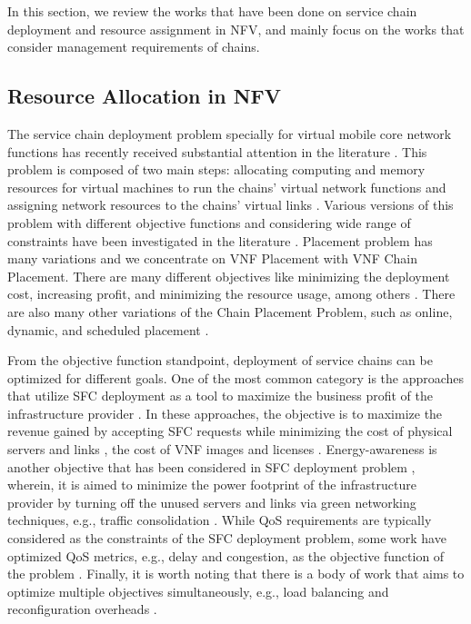 In this section, we review the works that have been done on service chain deployment and resource assignment in NFV, and mainly focus on the works that consider management requirements of chains.

\subsection{Resource Allocation in NFV}
The service chain deployment problem specially for virtual mobile core network functions has recently received substantial attention in the literature \cite{GilHerrera2016,Laghrissi2019,Bhamare2016}.
This problem is composed of two main steps: allocating computing and memory resources for virtual machines to run the chains' virtual network functions and assigning network resources to the chains' virtual links \cite{Laghrissi2019}. 
Various versions of this problem with different objective functions and considering wide range of constraints have been investigated in the literature \cite{Laghrissi2019}.
Placement problem has many variations and we concentrate on VNF Placement with VNF Chain Placement. There are many different objectives
like minimizing the deployment cost, increasing profit, and minimizing the resource usage, among others \cite{Laghrissi2019,Bhamare2016}.
There are also many other variations of the Chain Placement Problem, such as online, dynamic, and scheduled placement \cite{1608.00095}.

From the objective function standpoint, deployment of service chains can be optimized for different goals.
One of the most common category is the approaches that utilize SFC deployment as a tool to maximize the business profit of the infrastructure provider \cite{Eramo2016,Eramo2017,TahmasbiNejad2018,Huang2019}.
In these approaches, the objective is to maximize the revenue gained by accepting SFC requests while minimizing the cost of physical servers and links \cite{Bouet2015,Pham2020,Huang2019}, the cost of VNF images and licenses \cite{Bouet2015}.
Energy-awareness is another objective that has been considered in SFC deployment problem \cite{Eramo2017,Eramo20172,Farkiani2019},
wherein, it is aimed to minimize the power footprint of the infrastructure provider by turning off the unused servers and links via green networking techniques, e.g., traffic consolidation \cite{Zheng2020}.
While QoS requirements are typically considered as the constraints of the SFC deployment problem, some work have optimized QoS metrics, e.g., delay and congestion, as the objective function of the problem  \cite{Huang2019,Yu2017,Chen2017}.
Finally, it is worth noting that there is a body of work that aims to optimize multiple objectives simultaneously, e.g., load balancing and reconfiguration overheads \cite{Qu2020}.

